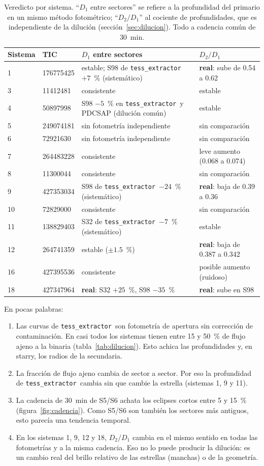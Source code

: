 \documentclass[11pt,a4paper]{article}
\newcommand{\tx}{\texttt{tess\_extractor}}
\newcommand{\Dum}{D_2/D_1}
\begin{document}
\begin{table}[H]
\centering
\caption{Veredicto por sistema. ``$D_1$ entre sectores'' se refiere a la profundidad del primario
en un mismo método fotométrico; ``$\Dum$'' al cociente de profundidades, que es independiente de la
dilución (sección~\ref{sec:dilucion}). Todo a cadencia común de 30~min.}
\label{tab:resumen}
\small
\begin{tabular}{llll}
\toprule
Sistema & TIC & $D_1$ entre sectores & $\Dum$ \\
\midrule
1  & 176775425 & estable; S98 de \tx\ $+7$~\% (sistemático) & \textbf{real}: sube de 0.54 a 0.62 \\
3  & 11412481  & consistente & estable \\
4  & 50897998  & S98 $-5$~\% en \tx\ y PDCSAP (dilución común) & estable \\
5  & 249074181 & sin fotometría independiente & sin comparación \\
6  & 72921630  & sin fotometría independiente & sin comparación \\
7  & 264483228 & consistente & leve aumento (0.068 a 0.074) \\
8  & 11300044  & consistente & sin comparación \\
9  & 427353034 & S98 de \tx\ $-24$~\% (sistemático) & \textbf{real}: baja de 0.39 a 0.36 \\
10 & 72829000  & consistente & sin comparación \\
11 & 138829403 & S32 de \tx\ $-7$~\% (sistemático) & estable \\
12 & 264741359 & estable ($\pm1.5$~\%) & \textbf{real}: baja de 0.387 a 0.342 \\
16 & 427395536 & consistente & posible aumento (ruidoso) \\
18 & 427347964 & \textbf{real}: S32 $+25$~\%, S98 $-35$~\% & \textbf{real}: sube en S98 \\
\bottomrule
\end{tabular}
\end{table}

En pocas palabras:
\begin{enumerate}
\item Las curvas de \tx\ son fotometría de apertura sin corrección de contaminación. En casi todos
  los sistemas tienen entre 15 y 50~\% de flujo ajeno a la binaria (tabla~\ref{tab:dilucion}). Esto
  achica las profundidades y, en starry, los radios de la secundaria.
\item La fracción de flujo ajeno cambia de sector a sector. Por eso la profundidad de \tx\ cambia sin
  que cambie la estrella (sistemas 1, 9 y 11).
\item La cadencia de 30~min de S5/S6 achata los eclipses cortos entre 5 y 15~\% (figura~\ref{fig:cadencia}).
  Como S5/S6 son también los sectores más antiguos, esto parecía una tendencia temporal.
\item En los sistemas 1, 9, 12 y 18, $\Dum$ cambia en el mismo sentido en todas las fotometrías y a la
  misma cadencia. Eso no lo puede producir la dilución: es un cambio real del brillo relativo de las
  estrellas (manchas) o de la geometría.
\end{enumerate}
\end{document}
